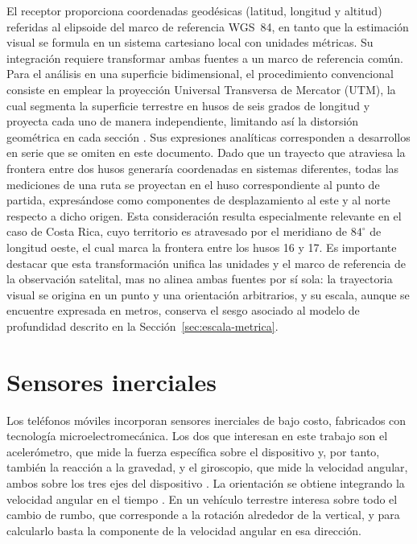 El receptor proporciona coordenadas geodésicas (latitud, longitud y altitud) referidas al elipsoide del marco de referencia WGS~84, en tanto que la estimación visual se formula en un sistema cartesiano local con unidades métricas.
Su integración requiere transformar ambas fuentes a un marco de referencia común.
Para el análisis en una superficie bidimensional, el procedimiento convencional consiste en emplear la proyección Universal Transversa de Mercator (UTM), la cual segmenta la superficie terrestre en husos de seis grados de longitud y proyecta cada uno de manera independiente, limitando así la distorsión geométrica en cada sección \cite{snyder1987projections}.
Sus expresiones analíticas corresponden a desarrollos en serie que se omiten en este documento.
Dado que un trayecto que atraviesa la frontera entre dos husos generaría coordenadas en sistemas diferentes, todas las mediciones de una ruta se proyectan en el huso correspondiente al punto de partida, expresándose como componentes de desplazamiento al este y al norte respecto a dicho origen.
Esta consideración resulta especialmente relevante en el caso de Costa Rica, cuyo territorio es atravesado por el meridiano de $84^{\circ}$ de longitud oeste, el cual marca la frontera entre los husos 16 y 17.
Es importante destacar que esta transformación unifica las unidades y el marco de referencia de la observación satelital, mas no alinea ambas fuentes por sí sola: la trayectoria visual se origina en un punto y una orientación arbitrarios, y su escala, aunque se encuentre expresada en metros, conserva el sesgo asociado al modelo de profundidad descrito en la Sección~\ref{sec:escala-metrica}.

\section{Sensores inerciales}
\label{sec:inerciales}

Los teléfonos móviles incorporan sensores inerciales de bajo costo, fabricados con tecnología microelectromecánica.
Los dos que interesan en este trabajo son el acelerómetro, que mide la fuerza específica sobre el dispositivo y, por tanto, también la reacción a la gravedad, y el giroscopio, que mide la velocidad angular, ambos sobre los tres ejes del dispositivo \cite{groves2013gnss}.
La orientación se obtiene integrando la velocidad angular en el tiempo \cite{groves2013gnss}.
En un vehículo terrestre interesa sobre todo el cambio de rumbo, que corresponde a la rotación alrededor de la vertical, y para calcularlo basta la componente de la velocidad angular en esa dirección.

